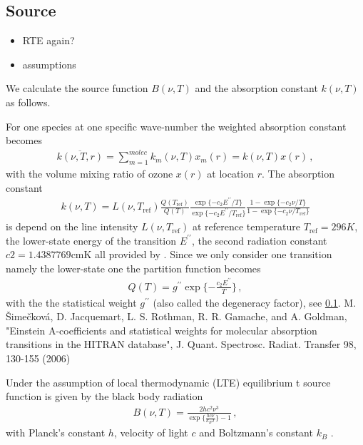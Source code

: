 \subsection{Source}
\begin{itemize}
	\item RTE again?
	\item assumptions
\end{itemize}
We calculate the source function $B(\nu, T)$ and the absorption constant $ k(\nu, T)$ as follows.

For one species at one specific wave-number the weighted absorption constant becomes
\begin{align}
	\overline{k(\nu, T, r)}    = \sum_{m=1}^{molec} k_m(\nu, T) x_m(r) =  k(\nu, T) x(r) \, ,
\end{align}
with the volume mixing ratio of ozone $x(r)$ at location $r$. 
The absorption constant
\begin{align}
	k(\nu, T) = L(\nu, T_{\text{ref}}) \frac{Q(T_{\text{ref}})}{Q(T)} \frac{ \exp{\{ - c_2 E^{\prime \prime} / T\}} }{\exp{\{ - c_2 E^{\prime \prime} / T_{\text{ref}} \}}} \frac{ 1- \exp{\{ - c_2 \nu  / T \}} }{1 - \exp{\{ - c_2 \nu / T_{\text{ref}} \}}}
\end{align}
is depend on the line intensity $L(\nu, T_{\text{ref}})$ at reference temperature $T_{\text{ref}} =296K $, the lower-state energy of the transition $ E^{\prime \prime} $, the second radiation constant $c2=1.4387769\text{cmK}$ all provided by \cite{}.
Since we only consider one transition namely the lower-state one the partition function becomes
\begin{align}
	Q(T )= g^{\prime \prime} \exp{\{ - \frac{ c_2 E^{\prime \prime} }{T}\}} \, ,
\end{align}
with the the statistical weight $ g^{\prime \prime}$ (also called the degeneracy factor), see \ref{}.
M. Šimečková, D. Jacquemart, L. S. Rothman, R. R. Gamache, and A. Goldman, "Einstein A-coefficients and statistical weights for molecular absorption transitions in the HITRAN database", J. Quant. Spectrosc. Radiat. Transfer 98, 130-155 (2006)

Under the assumption of local thermodynamic (LTE) equilibrium t source function is given by the black body radiation
\begin{align}
	B(\nu,T)   = \frac{2 h c^2 \nu^3}{\exp{\{\frac{hc\nu}{k_B T}\}}-1}\, ,
\end{align}
with Planck's constant $h$, velocity of light $c$ and Boltzmann's constant $k_B$ \cite{}.

